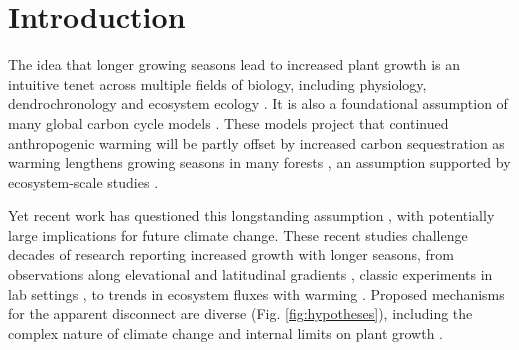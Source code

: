 \documentclass[11pt]{article}
\begin{document}
\section*{Introduction} %

The idea that longer growing seasons lead to increased plant growth is an intuitive tenet across multiple fields of biology, including physiology, dendrochronology and ecosystem ecology \citep{nobel1983biophysical,frank2022dendrochronology}. It is also a foundational assumption of many global carbon cycle models \citep[e.g.][]{friedlingstein2022global, ito2020global}. These models project that continued anthropogenic warming will be partly offset by increased carbon sequestration as warming lengthens growing seasons in many forests \citep{friedlingstein2022global}, an assumption supported by ecosystem-scale studies \citep{chen1999effects,keenan2014net,finzi2020}. 

Yet recent work has questioned this longstanding assumption \citep[e.g.][]{dow2022warm,green2022limits,silvestro2023longer}, with potentially large implications for future climate change. %
These recent studies challenge decades of research reporting increased growth with longer seasons, from observations along elevational and latitudinal gradients \citep[][]{myneni1997increased,berdanier2011growing,king2013tree,cuapio2022there}, classic experiments in lab settings \citep{went1957experimental}, to trends in ecosystem fluxes with warming \citep{chen1999effects,keenan2014net,finzi2020}. Proposed mechanisms for the apparent disconnect are diverse (Fig. \ref{fig:hypotheses}), including the complex nature of climate change \citep[e.g. drought or heat stress,][]{dow2022warm} and internal limits on plant growth  \citep{zohner2023effect}. %
\end{document}
